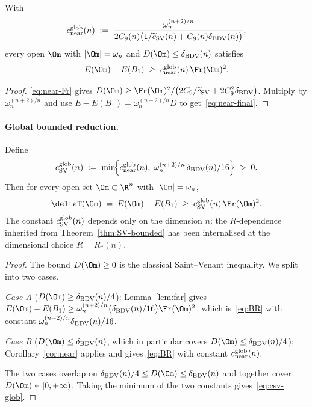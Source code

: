 \begin{corollary}\label{cor:near}
With
\begin{equation}\label{eq:c-near-glob}
c_{\rm near}^{\rm glob}(n)
\;:=\;
\frac{\omega_n^{(n+2)/n}}
{2C_9(n)\bigl(1/\widetilde c_{\rm SV}(n)+C_9(n)\delta_{\rm BDV}(n)\bigr)},
\end{equation}
every open $\Om$ with $|\Om|=\omega_n$ and
$D(\Om)\le\delta_{\rm BDV}(n)$ satisfies
\begin{equation}\label{eq:near-final}
E(\Om)-E(B_1) \;\ge\; c_{\rm near}^{\rm glob}(n)\,\Fr(\Om)^2.
\end{equation}
\end{corollary}

\begin{proof}
\eqref{eq:near-Fr} gives
$D(\Om)\ge\Fr(\Om)^2/\bigl(2C_9/\widetilde c_{\rm SV}+2C_9^2\delta_{\rm BDV}\bigr)$.
Multiply by $\omega_n^{(n+2)/n}$ and use $E-E(B_1)=\omega_n^{(n+2)/n}D$
to get~\eqref{eq:near-final}.
\end{proof}

\paragraph{Global bounded reduction.}

\begin{theorem}
\label{thm:BR}
Define
\begin{equation}\label{eq:csv-glob}
c_{\rm SV}^{\rm glob}(n)
\;:=\;
\min\!\Bigl\{
c_{\rm near}^{\rm glob}(n),\;
\omega_n^{(n+2)/n}\,\delta_{\rm BDV}(n)/16
\Bigr\}\;>\;0.
\end{equation}
Then for every open set $\Om\subset\R^n$ with $|\Om|=\omega_n$,
\begin{equation}\label{eq:BR}
\deltaT(\Om) \;=\; E(\Om)-E(B_1)
\;\ge\; c_{\rm SV}^{\rm glob}(n)\,\Fr(\Om)^2.
\end{equation}
The constant $c_{\rm SV}^{\rm glob}(n)$ depends only on the dimension
$n$: the $R$-dependence inherited from
Theorem~\ref{thm:SV-bounded} has been internalised at the
dimensional choice $R=R_*(n)$.
\end{theorem}

\begin{proof}
The bound $D(\Om)\ge 0$ is the classical Saint--Venant inequality.
We split into two cases.

\emph{Case A} ($D(\Om)\ge\delta_{\rm BDV}(n)/4$):
Lemma~\ref{lem:far} gives
$E(\Om)-E(B_1)\ge\omega_n^{(n+2)/n}\bigl(\delta_{\rm BDV}(n)/16\bigr)\Fr(\Om)^2$,
which is~\eqref{eq:BR} with constant
$\omega_n^{(n+2)/n}\delta_{\rm BDV}(n)/16$.

\emph{Case B} ($D(\Om)\le\delta_{\rm BDV}(n)$, which in particular
covers $D(\Om)\le\delta_{\rm BDV}(n)/4$):
Corollary~\ref{cor:near} applies and gives~\eqref{eq:BR} with
constant $c_{\rm near}^{\rm glob}(n)$.

The two cases overlap on
$\delta_{\rm BDV}(n)/4\le D(\Om)\le\delta_{\rm BDV}(n)$ and together
cover $D(\Om)\in[0,+\infty)$. Taking the minimum of the two
constants gives~\eqref{eq:csv-glob}.
\end{proof}

